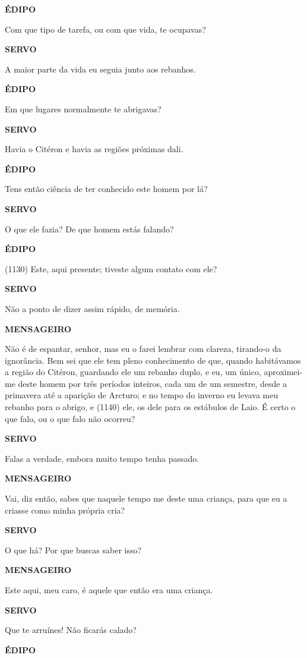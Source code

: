 \textbf{ÉDIPO}

Com que tipo de tarefa, ou com que vida, te ocupavas?

\textbf{SERVO}

A maior parte da vida eu seguia junto aos rebanhos.

\textbf{ÉDIPO}

Em que lugares normalmente te abrigavas?

\textbf{SERVO}

Havia o Citéron e havia as regiões próximas dali.

\textbf{ÉDIPO}

Tens então ciência de ter conhecido este homem por lá?

\textbf{SERVO}

O que ele fazia? De que homem estás falando?

\textbf{ÉDIPO}

(1130) Este, aqui presente; tiveste algum contato com ele?

\textbf{SERVO}

Não a ponto de dizer assim rápido, de memória.

\textbf{MENSAGEIRO}

Não é de espantar, senhor, mas eu o farei lembrar com clareza, tirando-o
da ignorância. Bem sei que ele tem pleno conhecimento de que, quando
habitávamos a região do Citéron, guardando ele um rebanho duplo, e eu,
um único, aproximei-me deste homem por três períodos inteiros, cada um
de um semestre, desde a primavera até a aparição de Arcturo; e no tempo
do inverno eu levava meu rebanho para o abrigo, e (1140) ele, os dele
para os estábulos de Laio. É certo o que falo, ou o que falo não
ocorreu?

\textbf{SERVO}

Falas a verdade, embora muito tempo tenha passado.

\textbf{MENSAGEIRO}

Vai, diz então, sabes que naquele tempo me deste uma criança, para que
eu a criasse como minha própria cria?

\textbf{SERVO}

O que há? Por que buscas saber isso?

\textbf{MENSAGEIRO}

Este aqui, meu caro, é aquele que então era uma criança.

\textbf{SERVO}

Que te arruínes! Não ficarás calado?

\textbf{ÉDIPO}

